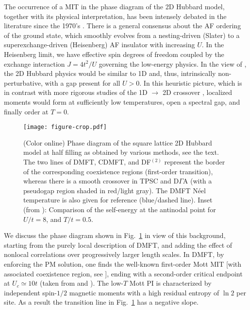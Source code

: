 \documentclass[rmp,aps,reprint,amsmath,amssymb,superscriptaddress,showpacs,nofootinbib]{revtex4-1}
\begin{document}
The occurrence of a MIT in the phase diagram of the 2D Hubbard model, together with its physical interpretation, has been intensely debated in the literature since the 1970's \cite{Castellani1979,Vekic1993,Vilk1996,Anderson1997,Vilk1997,Mancini2000,Moukouri2000,Avella2001,Hubbcollbook,Boies1995}. There is a general consensus about the AF ordering of the ground state, which smoothly evolves from a nesting-driven (Slater) to a superexchange-driven (Heisenberg) AF insulator with increasing $U$. In the Heisenberg limit, we have effective spin degrees of freedom coupled by the exchange interaction $J=4t^{2}/U$ governing the low-energy physics. In the view of , the 2D Hubbard physics would be similar to 1D and, thus, intrinsically non-perturbative, with a gap present for all $U>0$. In this heuristic picture, which is in contrast with more rigorous studies of the 1D $\rightarrow$ 2D crossover \cite{Castellani1992,Boies1995}, localized moments would form at sufficiently low temperatures, open a spectral gap, and finally order at $T=0$.

\begin{figure}[t]
  \texttt{[image: figure-crop.pdf]}
    \caption{(Color online) Phase diagram of the square lattice 2D Hubbard model at half filling as obtained by various methods, see the text. The two lines of DMFT, CDMFT, and DF$^{(2)}$ represent the border of the corresponding coexistence regions (first-order transition), whereas there is a smooth crossover in TPSC and D$\Gamma$A (with a pseudogap region shaded in red/light gray). The DMFT N\'eel temperature is also given for reference (blue/dashed line). Inset (from ): Comparison of the self-energy  at the antinodal point for $U/t=8$, and $T/t=0.5$.}
  \label{fig:pd2d}
\end{figure}

We discuss the phase diagram shown in Fig.~\ref{fig:pd2d} in view of this background, starting from the purely local description of DMFT, and adding the effect of nonlocal correlations over progressively larger length scales. In DMFT, by enforcing the PM solution, one finds the well-known first-order Mott MIT [with associated coexistence region, see ], ending with  a second-order critical endpoint at $U_c \simeq 10 t$ (taken from  and ).  The low-$T$ Mott PI is characterized by independent spin-$1/2$ magnetic moments with a high residual entropy of $\ln 2$ per site. As a result the transition line in Fig.~\ref{fig:pd2d} has a negative slope.
\end{document}
